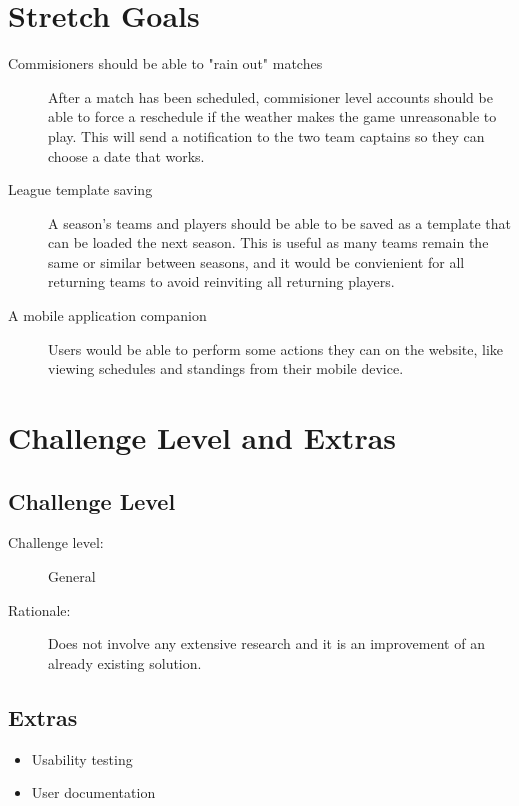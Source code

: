 \documentclass{article}
\begin{document}
\section{Stretch Goals}

\begin{description}
    \item [Commisioners should be able to "rain out" matches] After a match
    has been scheduled, commisioner level accounts should be able to force
    a reschedule if the weather makes the game unreasonable to play. This
    will send a notification to the two team captains so they can
    choose a date that works.
    \item [League template saving] A season's teams and players should be
    able to be saved as a template that can be loaded the next season. This
    is useful as many teams remain the same or similar between seasons, and
    it would be convienient for all returning teams to avoid reinviting all
    returning players.
    \item [A mobile application companion] Users would be able to perform
    some actions they can on the website, like viewing schedules and
    standings from their mobile device.
\end{description}

\section{Challenge Level and Extras}

\subsection{Challenge Level}
\begin{description}
    \item[Challenge level:] General
    \item[Rationale:] Does not involve any extensive research and it is an
    improvement of an already existing solution.
\end{description}

\subsection{Extras}
\begin{itemize}
    \item Usability testing
    \item User documentation
\end{itemize}
\end{document}
